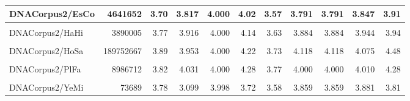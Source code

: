 \documentclass[12pt,twoside]{reedthesis}
\begin{document}
\begin{table}[!h]
{\begin{tabular}[t]{l|r|r|r|r|r|r|r|r|r|r}
\hline
DNACorpus2/EsCo & 4641652 & 3.70 & 3.817 & 4.000 & 4.02 & 3.57 & 3.791 & 3.791 & 3.847 & 3.91\\
\hline
\cellcolor{gray!6}{DNACorpus2/GaGa} & \cellcolor{gray!6}{148532294} & \cellcolor{gray!6}{3.74} & \cellcolor{gray!6}{3.776} & \cellcolor{gray!6}{4.000} & \cellcolor{gray!6}{4.15} & \cellcolor{gray!6}{3.65} & \cellcolor{gray!6}{3.943} & \cellcolor{gray!6}{3.943} & \cellcolor{gray!6}{3.897} & \cellcolor{gray!6}{4.10}\\
\hline
DNACorpus2/HaHi & 3890005 & 3.77 & 3.916 & 4.000 & 4.14 & 3.63 & 3.884 & 3.884 & 3.944 & 3.94\\
\hline
\cellcolor{gray!6}{DNACorpus2/HePy} & \cellcolor{gray!6}{1667825} & \cellcolor{gray!6}{3.77} & \cellcolor{gray!6}{3.884} & \cellcolor{gray!6}{4.000} & \cellcolor{gray!6}{4.14} & \cellcolor{gray!6}{3.67} & \cellcolor{gray!6}{3.894} & \cellcolor{gray!6}{3.894} & \cellcolor{gray!6}{3.942} & \cellcolor{gray!6}{4.01}\\
\hline
DNACorpus2/HoSa & 189752667 & 3.89 & 3.953 & 4.000 & 4.22 & 3.73 & 4.118 & 4.118 & 4.075 & 4.48\\
\hline
\cellcolor{gray!6}{DNACorpus2/OrSa} & \cellcolor{gray!6}{43262523} & \cellcolor{gray!6}{3.73} & \cellcolor{gray!6}{3.843} & \cellcolor{gray!6}{4.000} & \cellcolor{gray!6}{4.21} & \cellcolor{gray!6}{3.65} & \cellcolor{gray!6}{3.858} & \cellcolor{gray!6}{3.858} & \cellcolor{gray!6}{3.908} & \cellcolor{gray!6}{4.62}\\
\hline
DNACorpus2/PlFa & 8986712 & 3.82 & 4.031 & 4.000 & 4.28 & 3.77 & 4.000 & 4.000 & 4.010 & 4.28\\
\hline
\cellcolor{gray!6}{DNACorpus2/ScPo} & \cellcolor{gray!6}{10652155} & \cellcolor{gray!6}{3.68} & \cellcolor{gray!6}{3.847} & \cellcolor{gray!6}{4.000} & \cellcolor{gray!6}{4.07} & \cellcolor{gray!6}{3.57} & \cellcolor{gray!6}{3.813} & \cellcolor{gray!6}{3.813} & \cellcolor{gray!6}{3.851} & \cellcolor{gray!6}{3.91}\\
\hline
DNACorpus2/YeMi & 73689 & 3.78 & 3.099 & 3.998 & 3.72 & 3.58 & 3.859 & 3.859 & 3.881 & 3.81\\
\hline
\end{tabular}}
\end{table}
\end{document}
